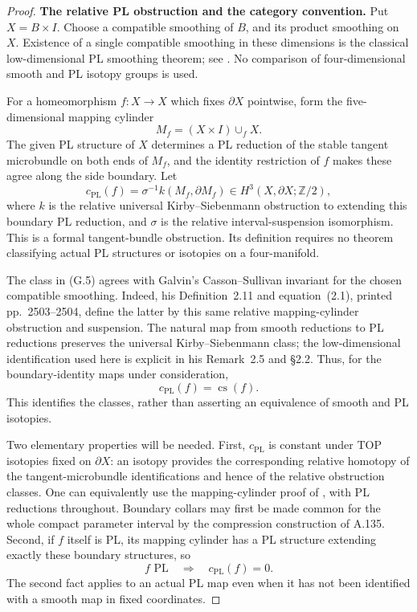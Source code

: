 \begin{proof}
\textbf{The relative PL obstruction and the category convention.}
Put $X=B\times I$. Choose a compatible smoothing of $B$, and its product
smoothing on $X$. Existence of a single compatible smoothing in these
dimensions is the classical low-dimensional PL smoothing theorem; see
\cite[Essay I, p.~39, final paragraph]{KirbySiebenmann1977}. No
comparison of four-dimensional smooth and PL isotopy groups is used.

For a homeomorphism $f:X\to X$ which fixes $\partial X$ pointwise, form
the five-dimensional mapping cylinder
\[
 M_f=(X\times I)\mathbin{\cup_f}X.
                                                        \tag{G.4}
\]
The given PL structure of $X$ determines a PL reduction of the stable
tangent microbundle on both ends of $M_f$, and the identity restriction
of $f$ makes these agree along the side boundary. Let
\[
 c_{\mathrm{PL}}(f)=
 \sigma^{-1}k(M_f,\partial M_f)
       \in H^3(X,\partial X;\mathbb Z/2),
                                                        \tag{G.5}
\]
where $k$ is the relative universal Kirby--Siebenmann obstruction to
extending this boundary PL reduction, and $\sigma$ is the relative
interval-suspension isomorphism. This is a formal tangent-bundle
obstruction. Its definition requires no theorem classifying actual PL
structures or isotopies on a four-manifold.

The class in (G.5) agrees with Galvin's Casson--Sullivan invariant for
the chosen compatible smoothing. Indeed, his Definition~2.11 and
equation~(2.1), printed pp.~2503--2504, define the latter by this same
relative mapping-cylinder obstruction and suspension. The natural map
from smooth reductions to PL reductions preserves the universal
Kirby--Siebenmann class; the low-dimensional identification used here is
explicit in his Remark~2.5 and \S2.2. Thus, for the boundary-identity maps
under consideration,
\[
             c_{\mathrm{PL}}(f)=\operatorname{cs}(f).
                                                        \tag{G.6}
\]
This identifies the classes, rather than asserting an equivalence of
smooth and PL isotopies.

Two elementary properties will be needed. First, $c_{\mathrm{PL}}$ is
constant under TOP isotopies fixed on $\partial X$: an isotopy provides
the corresponding relative homotopy of the tangent-microbundle
identifications and hence of the relative obstruction classes. One can
equivalently use the mapping-cylinder proof of
\cite[Proposition~2.22, printed pp.~2507--2508]{Galvin2026}, with PL
reductions throughout. Boundary collars may first be made common for
the whole compact parameter interval by the compression construction
of A.135. Second, if $f$ itself is PL, its mapping cylinder has a PL
structure extending exactly these boundary structures, so
\[
                 f\text{ PL}\quad\Longrightarrow\quad
                 c_{\mathrm{PL}}(f)=0.
                                                        \tag{G.7}
\]
The second fact applies to an actual PL map even when it has not been
identified with a smooth map in fixed coordinates.


\end{proof}
